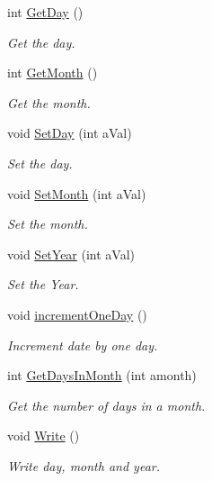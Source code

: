 \begin{DoxyCompactItemize}
int \mbox{\hyperlink{classtime_class_aa593aee7c9ef8d70716e1f9fb3206545}{Get\+Day}} ()
\begin{DoxyCompactList}\small\item\em Get the day. \end{DoxyCompactList}\item 
int \mbox{\hyperlink{classtime_class_a33068a0b7d33d339875e4e31382223f2}{Get\+Month}} ()
\begin{DoxyCompactList}\small\item\em Get the month. \end{DoxyCompactList}\item 
void \mbox{\hyperlink{classtime_class_aa22bf20129df0d1b9ad983e3a8a7643f}{Set\+Day}} (int a\+Val)
\begin{DoxyCompactList}\small\item\em Set the day. \end{DoxyCompactList}\item 
void \mbox{\hyperlink{classtime_class_a4258de73d22742686c824673e1f08c6d}{Set\+Month}} (int a\+Val)
\begin{DoxyCompactList}\small\item\em Set the month. \end{DoxyCompactList}\item 
void \mbox{\hyperlink{classtime_class_a79d58ba7b93a061a0275fc5f0b70285c}{Set\+Year}} (int a\+Val)
\begin{DoxyCompactList}\small\item\em Set the Year. \end{DoxyCompactList}\item 
void \mbox{\hyperlink{classtime_class_af97ba8f356b5f00503596d703d556623}{increment\+One\+Day}} ()
\begin{DoxyCompactList}\small\item\em Increment date by one day. \end{DoxyCompactList}\item 
int \mbox{\hyperlink{classtime_class_a32dd8f1721ce77bac40e301d14805be4}{Get\+Days\+In\+Month}} (int amonth)
\begin{DoxyCompactList}\small\item\em Get the number of days in a month. \end{DoxyCompactList}\item 
void \mbox{\hyperlink{classtime_class_a5d91f0093fdb3f9c16dbd945703e0725}{Write}} ()
\begin{DoxyCompactList}\small\item\em Write day, month and year. \end{DoxyCompactList}\end{DoxyCompactItemize}


